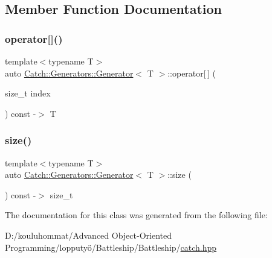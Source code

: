 \subsection{Member Function Documentation}
\mbox{\label{class_catch_1_1_generators_1_1_generator_ad8835935e962baaf1fab6c6dcac83865}} 
\subsubsection{\texorpdfstring{operator[]()}{operator[]()}}
{\footnotesize\ttfamily template$<$typename T$>$ \\
auto \mbox{\hyperlink{class_catch_1_1_generators_1_1_generator}{Catch\+::\+Generators\+::\+Generator}}$<$ T $>$\+::operator\mbox{[}$\,$\mbox{]} (\begin{DoxyParamCaption}\item[{size\+\_\+t}]{index }\end{DoxyParamCaption}) const -\/$>$ T \hspace{0.3cm}{\ttfamily [inline]}}

\mbox{\label{class_catch_1_1_generators_1_1_generator_a4ebea9a7448f8f374bc7cff5d7b63041}} 
\subsubsection{\texorpdfstring{size()}{size()}}
{\footnotesize\ttfamily template$<$typename T$>$ \\
auto \mbox{\hyperlink{class_catch_1_1_generators_1_1_generator}{Catch\+::\+Generators\+::\+Generator}}$<$ T $>$\+::size (\begin{DoxyParamCaption}{ }\end{DoxyParamCaption}) const -\/$>$ size\+\_\+t \hspace{0.3cm}{\ttfamily [inline]}}



The documentation for this class was generated from the following file\+:\begin{DoxyCompactItemize}
\item 
D\+:/kouluhommat/\+Advanced Object-\/\+Oriented Programming/lopputyö/\+Battleship/\+Battleship/\mbox{\hyperlink{catch_8hpp}{catch.\+hpp}}\end{DoxyCompactItemize}
